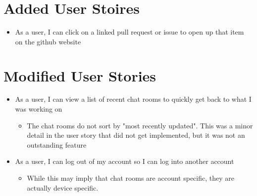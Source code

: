 \documentclass{report}
\begin{document}
\section{Added User Stoires}
\begin{itemize}
    \item As a user, I can click on a linked pull request or issue to open up that item on the github website
\end{itemize}
\section{Modified User Stories}
\begin{itemize}
    \item As a user, I can view a list of recent chat rooms to quickly get back to what I was working on \begin{itemize}
        \item The chat rooms do not sort by "most recently updated". This was a minor detail in the user story that did not get implemented, but it was not an outstanding feature
    \end{itemize}
    \item As a user, I can log out of my account so I can log into another account\begin{itemize}
        \item While this may imply that chat rooms are account specific, they are actually device specific.
    \end{itemize}
\end{itemize}
\end{document}

